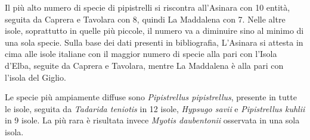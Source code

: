 {Il più alto numero di specie di pipistrelli si riscontra all’Asinara con 10 entità, seguita da Caprera e Tavolara con 8, quindi La Maddalena con 7. Nelle altre isole, soprattutto in quelle più piccole, il numero va a diminuire sino al minimo di una sola specie. Sulla base dei dati presenti in bibliografia, L’Asinara si attesta in cima alle isole italiane con il maggior numero di specie alla pari con l’Isola d’Elba, seguite da Caprera e Tavolara, mentre La Maddalena è alla pari con l’isola del Giglio.

Le specie più ampiamente diffuse sono \emph{Pipistrellus pipistrellus}, presente in tutte le isole, seguita da \emph{Tadarida teniotis} in 12 isole, \emph{Hypsugo savii} e \emph{Pipistrellus kuhlii} in 9 isole. La più rara è risultata invece \emph{Myotis  daubentonii} osservata in una sola isola.
} %